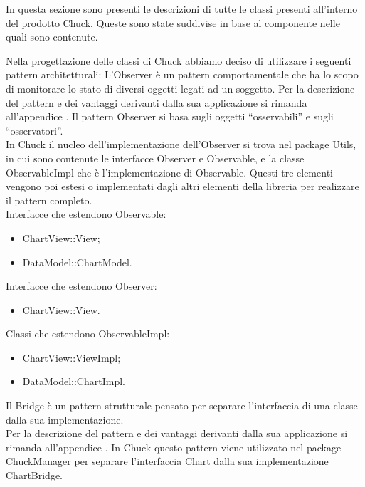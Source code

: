 		
		
		
		
		In questa sezione sono presenti le descrizioni di tutte le classi presenti all'interno del prodotto Chuck. Queste sono state suddivise in base al componente nelle quali sono contenute.
		
Nella progettazione delle classi di Chuck abbiamo deciso di utilizzare i seguenti pattern architetturali:
	L'Observer è un pattern comportamentale che ha lo scopo di monitorare lo stato di diversi oggetti legati ad un soggetto.
	Per la descrizione del pattern e dei vantaggi derivanti dalla sua applicazione si rimanda all'appendice .
	Il pattern Observer si basa sugli oggetti “osservabili” e sugli “osservatori”. \\In Chuck il nucleo dell'implementazione dell'Observer si trova nel package Utils, in cui sono contenute le interfacce Observer e Observable, e la classe ObservableImpl che è l'implementazione di Observable. Questi tre elementi vengono poi estesi o implementati dagli altri elementi della libreria per realizzare il pattern completo.\\
	Interfacce che estendono Observable:
	\begin{itemize}
	\item ChartView::View;
	\item DataModel::ChartModel.
	\end{itemize}
	Interfacce che estendono Observer:
	\begin{itemize}
	\item ChartView::View.
	\end{itemize}
	Classi che estendono ObservableImpl:
	\begin{itemize}
	\item ChartView::ViewImpl;
	\item DataModel::ChartImpl.
	\end{itemize}
	Il Bridge è un pattern strutturale pensato per separare l'interfaccia di una classe dalla sua implementazione.\\ Per la descrizione del pattern e dei vantaggi derivanti dalla sua applicazione si rimanda all'appendice .
	In Chuck questo pattern viene utilizzato nel package ChuckManager per separare l'interfaccia Chart dalla sua implementazione ChartBridge.
